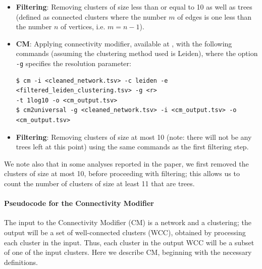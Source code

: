 \documentclass[a4paper]{article}   	%
\begin{document}
\begin{itemize}
\item  \textbf{Filtering}: Removing clusters of size less than or equal to 10 as well as trees (defined as connected clusters where the number $m$ of edges is one less than the number $n$ of vertices, i.e. $m=n-1$).
\item  \textbf{CM}: Applying connectivity modifier, available at \cite{cm2022},
 with the following commands (assuming the clustering method used is Leiden), where the option \texttt{-g} specifies the resolution parameter:
\begin{lstlisting}[basicstyle=\ttfamily\small]
$ cm -i <cleaned_network.tsv> -c leiden -e <filtered_leiden_clustering.tsv> -g <r>
-t 1log10 -o <cm_output.tsv>
$ cm2universal -g <cleaned_network.tsv> -i <cm_output.tsv> -o <cm_output.tsv>
\end{lstlisting}
\item \textbf{Filtering}: Removing clusters of size at most 10  (note: there will not be any trees left at this point) using the same commands as the first filtering step.
\end{itemize}

We note also that in some analyses reported in the paper, we first removed the clusters of size at most 10, before proceeding with filtering; this allows us
to count the number of clusters of size at least 11 that are trees.



\paragraph{Pseudocode for the Connectivity Modifier}
The input to the Connectivity Modifier (CM) is a network and a  clustering; the output will be a set of well-connected clusters (WCC), obtained
by processing each cluster in the input.
Thus, each cluster in the output WCC will be a subset of one of the input clusters.
Here we describe CM, beginning  with the necessary definitions.
\end{document}
